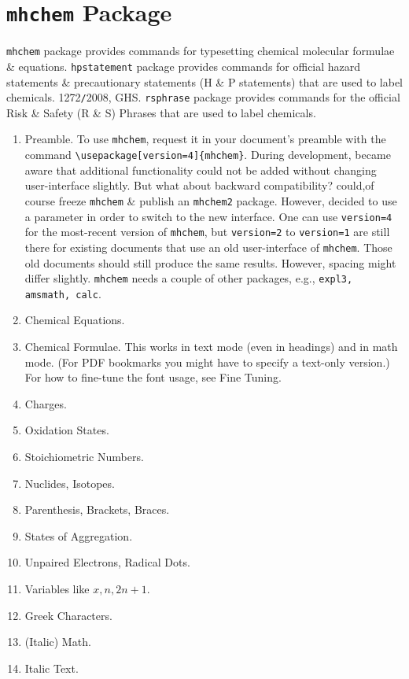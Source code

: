 \documentclass{article}
\begin{document}
\section{{\tt mhchem} Package}
{\tt mhchem} package provides commands for typesetting chemical molecular formulae \& equations. {\tt hpstatement} package provides commands for official hazard statements \& precautionary statements (H \& P statements) that are used to label chemicals. 1272{\tt/}2008, GHS. {\tt rsphrase} package provides commands for the official Risk \& Safety (R \& S) Phrases that are used to label chemicals.
\begin{enumerate}
	\item {\sf Preamble.} To use {\tt mhchem}, request it in your document's preamble with the command \verb|\usepackage[version=4]{mhchem}|. During development, became aware that additional functionality could not be added without changing user-interface slightly. But what about backward compatibility? could,of course freeze {\tt mhchem} \& publish an {\tt mhchem2} package. However, decided to use a parameter in order to switch to the new interface. One can use {\tt version=4} for the most-recent version of {\tt mhchem}, but {\tt version=2} to {\tt version=1} are still there for existing documents that use an old user-interface of {\tt mhchem}. Those old documents should still produce the same results. However, spacing might differ slightly. {\tt mhchem} needs a couple of other packages, e.g., {\tt expl3, amsmath, calc}.
	\item {\sf Chemical Equations.}
	\item {\sf Chemical Formulae.} This works in text mode (even in headings) and in math mode. (For PDF bookmarks you might have to specify a text-only version.) For how to fine-tune the font usage, see Fine Tuning.
	\item {\sf Charges.}
	\item {\sf Oxidation States.}
	\item {\sf Stoichiometric Numbers.}
	\item {\sf Nuclides, Isotopes.}
	\item {\sf Parenthesis, Brackets, Braces.}
	\item {\sf States of Aggregation.}
	\item {\sf Unpaired Electrons, Radical Dots.}
	\item {\sf Variables like $x,n,2n + 1$.}
	\item {\sf Greek Characters.}
	\item {\sf (Italic) Math.}
	\item {\sf Italic Text.}

\end{enumerate}
\end{document}
